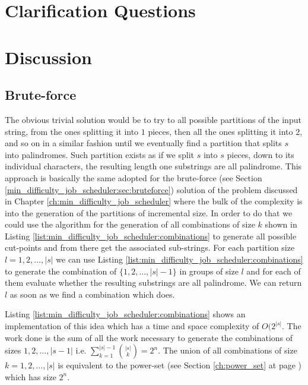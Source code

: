 \section{Clarification Questions}

\begin{QandA}
	\item 
	\begin{answered}
		\textit{}
	\end{answered}
	
\end{QandA}

\section{Discussion}
\label{palindrome_partitioning2:sec:discussion}


\subsection{Brute-force}
\label{palindrome_partitioning2:sec:bruteforce}
The obvious trivial solution would be to try to all possible partitions of the input string, from
the ones splitting it into $1$ pieces, then all the ones splitting it into $2$, and so on in a
similar fashion until we eventually find a partition that splits $s$ into palindromes. Such
partition exists as if we split $s$ into $s$ pieces, down to its individual characters, the
resulting length one substrings are all palindrome. This approach is basically the same adopted for
the brute-force (see Section \ref{min_difficulty_job_scheduler:sec:bruteforce}) solution of the
problem discussed in Chapter \ref{ch:min_difficulty_job_scheduler} where the bulk of the complexity
is into the generation of the partitions of incremental size. In order to do that we could use the
algorithm for the generation of all combinations of size $k$ shown in Listing
\ref{list:min_difficulty_job_scheduler:combinations} to generate all possible cut-points and from
there get the associated sub-strings. For each partition size $l = 1,2,\ldots,|s|$ we can use
Listing \ref{list:min_difficulty_job_scheduler:combinations} to generate the combination of
$\{1,2,\ldots,|s|-1\}$ in groups of size $l$ and for each of them evaluate whether the resulting
substrings are all palindrome. We can return $l$ as soon as we find a combination which does.

Listing \ref{list:min_difficulty_job_scheduler:combinations} shows an implementation of this idea
which has a time and space complexity of $O(2^{|s|}$. The work done is the sum of all the work
necessary to generate the combinations of sizes $1,2,\ldots,|s-1|$ i.e. $\sum_{k=1}^{|s|-1} {|s|
\choose k} = 2^n$. The union of all combinations of size $k=1,2,\ldots,|s|$ is equivalent to the
power-set (see Section \ref{ch:power_set} at page \pageref{sec:powerset:discussion}) which has size
$2^n$.

